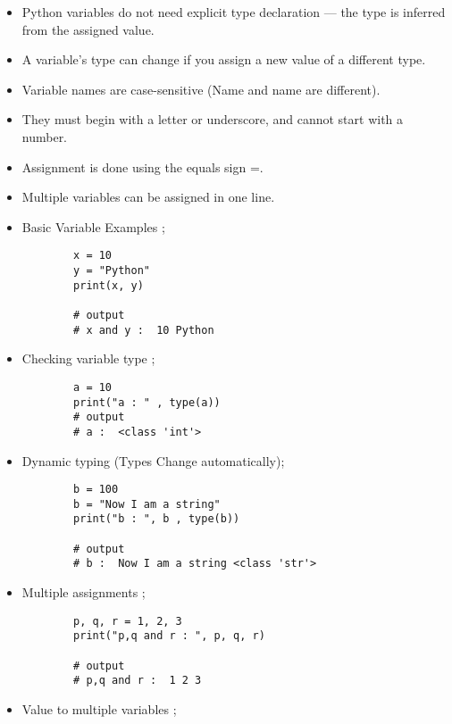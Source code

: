 \documentclass[a4paper,11pt]{article}
\theoremstyle{mytheor}
\begin{document}
\begin{itemize}
	\item Python variables do not need explicit type declaration — the type is inferred from the assigned value.
	
	\item A variable’s type can change if you assign a new value of a different type.
	
	\item Variable names are case-sensitive (Name and name are different).
	
	\item They must begin with a letter or underscore, and cannot start with a number.
	
	\item Assignment is done using the equals sign =.
	
	\item Multiple variables can be assigned in one line.
	
	\item Basic Variable Examples ;

	
	\begin{lstlisting}
		x = 10
		y = "Python"
		print(x, y)
		
		# output 
		# x and y :  10 Python
	\end{lstlisting}
	
	\item Checking variable type ;
	
	\begin{lstlisting}
		a = 10
		print("a : " , type(a))
		# output
		# a :  <class 'int'>
	\end{lstlisting}
	
	\item Dynamic typing (Types Change automatically);
	
	\begin{lstlisting}
		b = 100
		b = "Now I am a string"
		print("b : ", b , type(b))
		
		# output
		# b :  Now I am a string <class 'str'>
	\end{lstlisting}
	
	\item Multiple assignments ;
	
	\begin{lstlisting}
		p, q, r = 1, 2, 3
		print("p,q and r : ", p, q, r)
		
		# output
		# p,q and r :  1 2 3
	\end{lstlisting}
	
	\item Value to multiple variables ;
	

\end{itemize}
\end{document}
